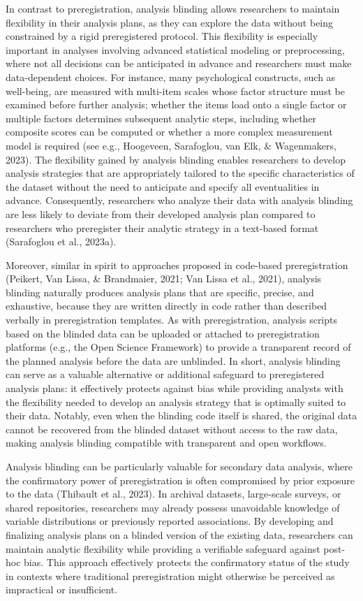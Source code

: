\documentclass[
  english,
  man,floatsintext]{apa6}
\begin{document}
In contrast to preregistration, analysis blinding allows researchers to maintain flexibility in their analysis plans, as they can explore the data without being constrained by a rigid preregistered protocol. This flexibility is especially important in analyses involving advanced statistical modeling or preprocessing, where not all decisions can be anticipated in advance and researchers must make data-dependent choices. For instance, many psychological constructs, such as well-being, are measured with multi-item scales whose factor structure must be examined before further analysis; whether the items load onto a single factor or multiple factors determines subsequent analytic steps, including whether composite scores can be computed or whether a more complex measurement model is required (see e.g., {Hoogeveen, Sarafoglou, van Elk, \& Wagenmakers}, 2023). The flexibility gained by analysis blinding enables researchers to develop analysis strategies that are appropriately tailored to the specific characteristics of the dataset without the need to anticipate and specify all eventualities in advance. Consequently, researchers who analyze their data with analysis blinding are less likely to deviate from their developed analysis plan compared to researchers who preregister their analytic strategy in a text-based format (Sarafoglou et al., 2023a).

Moreover, similar in spirit to approaches proposed in code-based preregistration (Peikert, Van Lissa, \& Brandmaier, 2021; Van Lissa et al., 2021), analysis blinding naturally produces analysis plans that are specific, precise, and exhaustive, because they are written directly in code rather than described verbally in preregistration templates. As with preregistration, analysis scripts based on the blinded data can be uploaded or attached to preregistration platforms (e.g., the Open Science Framework) to provide a transparent record of the planned analysis before the data are unblinded. In short, analysis blinding can serve as a valuable alternative or additional safeguard to preregistered analysis plans: it effectively protects against bias while providing analysts with the flexibility needed to develop an analysis strategy that is optimally suited to their data. Notably, even when the blinding code itself is shared, the original data cannot be recovered from the blinded dataset without access to the raw data, making analysis blinding compatible with transparent and open workflows.

Analysis blinding can be particularly valuable for secondary data analysis, where the confirmatory power of preregistration is often compromised by prior exposure to the data (Thibault et al., 2023). In archival datasets, large-scale surveys, or shared repositories, researchers may already possess unavoidable knowledge of variable distributions or previously reported associations. By developing and finalizing analysis plans on a blinded version of the existing data, researchers can maintain analytic flexibility while providing a verifiable safeguard against post-hoc bias. This approach effectively protects the confirmatory status of the study in contexts where traditional preregistration might otherwise be perceived as impractical or insufficient.
\end{document}
